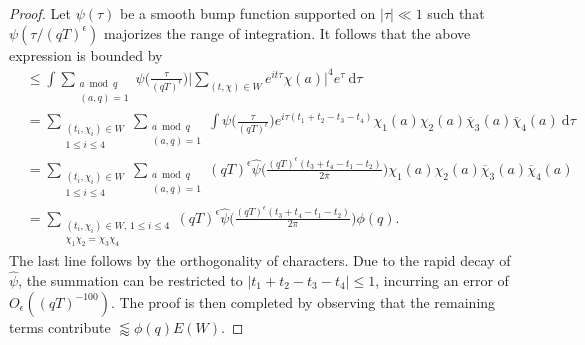\documentclass[12pt]{amsart}
\theoremstyle{definition}
\theoremstyle{plain}
\theoremstyle{remark}
\numberwithin{equation}{section}
\numberwithin{theorem}{section}
\numberwithin{equation}{section}
\begin{document}
\begin{proof}
		Let $\psi(\tau)$ be a smooth bump function supported on $|\tau| \ll 1$ such that $\psi(\tau/(qT)^{\epsilon})$ majorizes the range of integration. It follows that the above expression is bounded by
		\begin{align*}
			&\leq \int\sum_{\substack{a \bmod q \\ (a,q)=1}}\psi\bigg(\frac{\tau}{(qT)^{\epsilon}}\bigg)\bigg|\sum_{(t, \chi) \in W}e^{it\tau}\chi(a)\bigg|^{4}e^{\tau}\:\mathrm{d}\tau
			\\
			&=\sum_{\substack{(t_{i}, \chi_{i})\in W \\ 1\leq i \leq 4}}\sum_{\substack{a \bmod q \\ (a,q)=1}}\int \psi\bigg(\frac{\tau}{(qT)^{\epsilon}}\bigg)e^{i\tau(t_{1}+t_{2}-t_{3}-t_{4})}\chi_{1}(a)\chi_{2}(a)\overline{\chi}_{3}(a)\overline{\chi}_{4}(a)\:\mathrm{d}\tau
			\\
			&=\sum_{\substack{(t_{i}, \chi_{i})\in W \\ 1\leq i \leq 4}}\sum_{\substack{a \bmod q \\ (a,q)=1}}(qT)^{\epsilon} \hat{\psi}\bigg(\frac{(qT)^{\epsilon}(t_{3}+t_{4}-t_{1}-t_{2})}{2\pi}\bigg)\chi_{1}(a)\chi_{2}(a)\overline{\chi}_{3}(a)\overline{\chi}_{4}(a)
			\\
			&=\sum_{\substack{(t_{i}, \chi_{i})\in W, \, 1\leq i \leq 4 \\ \chi_{1}\chi_{2}=\chi_{3}\chi_{4}}}(qT)^{\epsilon} \hat{\psi}\bigg(\frac{(qT)^{\epsilon}(t_{3}+t_{4}-t_{1}-t_{2})}{2\pi}\bigg)\phi(q).
		\end{align*}
		The last line follows by the orthogonality of characters. Due to the rapid decay of $\hat{\psi}$,  the summation can be restricted to $|t_{1}+t_{2}-t_{3}-t_{4}| \leq 1$, incurring an error of $O_{\epsilon}((qT)^{-100})$. The proof is then completed by observing that the remaining terms contribute $\lessapprox \phi(q)E(W)$.
	\end{proof}
	
\end{document}
